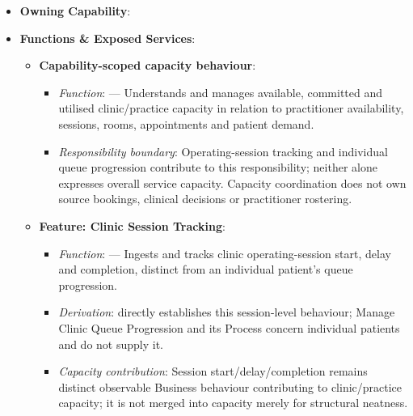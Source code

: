 \begin{itemize}

\item
\textbf{Owning Capability}: \texttt{}



\item
\textbf{Functions \& Exposed Services}:


\begin{itemize}

\item
\textbf{Capability-scoped capacity behaviour}:


\begin{itemize}

\item
\emph{Function}: \texttt{} — Understands and manages available, committed and utilised clinic/\allowbreak{}practice capacity in relation to practitioner availability, sessions, rooms, appointments and patient demand.



\item
\emph{Responsibility boundary}: Operating-session tracking and individual queue progression contribute to this responsibility; neither alone expresses overall service capacity. Capacity coordination does not own source bookings, clinical decisions or practitioner rostering.



\end{itemize}


\item
\textbf{Feature: Clinic Session Tracking}:


\begin{itemize}

\item
\emph{Function}: \texttt{} — Ingests and tracks clinic operating-session start, delay and completion, distinct from an individual patient's queue progression.



\item
\emph{Derivation}: \texttt{} directly establishes this session-level behaviour; Manage Clinic Queue Progression and its Process concern individual patients and do not supply it.



\item
\emph{Capacity contribution}: Session start/\allowbreak{}delay/\allowbreak{}completion remains distinct observable Business behaviour contributing to clinic/\allowbreak{}practice capacity; it is not merged into capacity merely for structural neatness.




\end{itemize}
\end{itemize}
\end{itemize}
